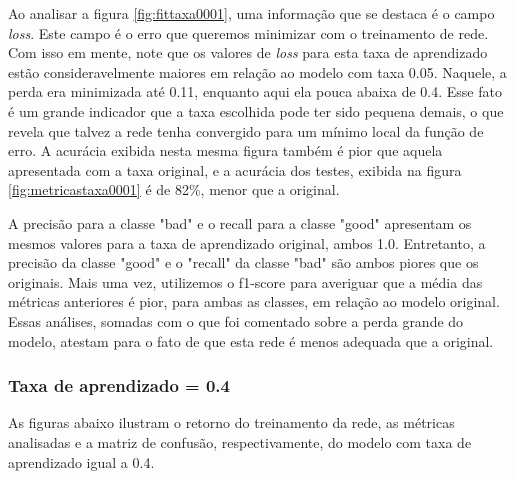 \documentclass[12pt]{article}
\begin{document}
Ao analisar a figura \ref{fig:fittaxa0001}, uma informação que se destaca é o campo \textit{loss}. Este campo é o erro que queremos minimizar com o treinamento de rede. Com isso em mente, note que os valores de \textit{loss} para esta taxa de aprendizado estão consideravelmente maiores em relação ao modelo com taxa 0.05. Naquele, a perda era minimizada até 0.11, enquanto aqui ela pouca abaixa de 0.4. Esse fato é um grande indicador que a taxa escolhida pode ter sido pequena demais, o que revela que talvez a rede tenha convergido para um mínimo local da função de erro. A acurácia exibida nesta mesma figura também é pior que aquela apresentada com a taxa original, e a acurácia dos testes, exibida na figura \ref{fig:metricastaxa0001} é de 82\%, menor que a original.

A precisão para a classe "bad" e o recall para a classe "good" apresentam os mesmos valores para a taxa de aprendizado original, ambos 1.0. Entretanto, a precisão da classe "good" e o "recall" da classe "bad" são ambos piores que os originais. Mais uma vez, utilizemos o f1-score para averiguar que a média das métricas anteriores é pior, para ambas as classes, em relação ao modelo original. Essas análises, somadas com o que foi comentado sobre a perda grande do modelo, atestam para o fato de que esta rede é menos adequada que a original. 
\subsubsection{Taxa de aprendizado = 0.4}

As figuras abaixo ilustram o retorno do treinamento da rede, as métricas analisadas e a matriz de confusão, respectivamente, do modelo com taxa de aprendizado igual a 0.4. 
\end{document}
